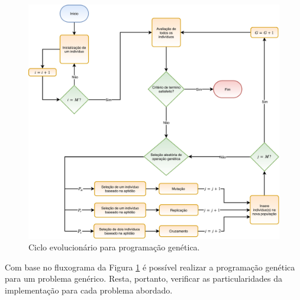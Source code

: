 \begin{figure}[!h]
\centering
\includegraphics[width=1\linewidth]{02_desenvolvimento/01_Pg_Fig_CicloCompleto.pdf}
\caption{Ciclo evolucionário para programação genética.}\label{fig:1pg-ciclocompleto}
\end{figure}

Com base no fluxograma da Figura \ref{fig:1pg-ciclocompleto} é possível realizar a programação genética para um problema genérico. Resta, portanto, verificar as particularidades da implementação para cada problema abordado.


